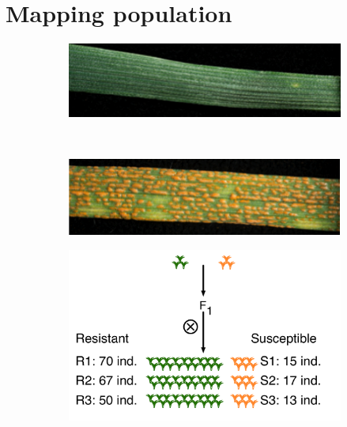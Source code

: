 \section{Mapping population}
\label{sub:mappingPopulation}
\begin{figure}
    \centering
     
     \begin{subfigure}[b]{0.4\textwidth}
        \caption{}
        \includegraphics[width=1\textwidth]{Yr15/Figures/population/Yr15Photo.png}
        \label{fig:yr15.yr15Photo}
    \end{subfigure}
    ~
    \begin{subfigure}[b]{0.4\textwidth}
        \caption{}
        \includegraphics[width=1\textwidth]{Yr15/Figures/population/AVSPhoto.png}
        \label{fig:yr15:avsPhoto}
    \end{subfigure}

     \begin{subfigure}[b]{0.9\textwidth}
     \caption{}
        \includegraphics[width=1\textwidth]{Yr15/Figures/population/F2Population.pdf} 
    \label{fig:yr15:f2}
  \end{subfigure}


\end{figure}

